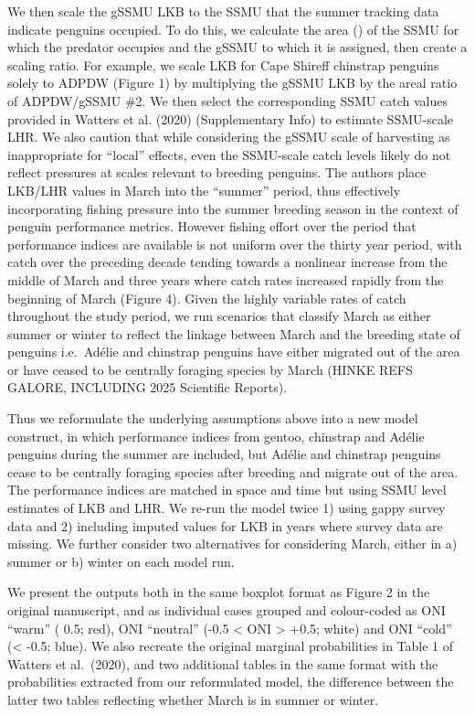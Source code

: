 \documentclass[]{elsarticle} %
\begin{document}
We then scale the gSSMU LKB to the SSMU that the summer tracking data
indicate penguins occupied. To do this, we calculate the area () of the
SSMU for which the predator occupies and the gSSMU to which it is
assigned, then create a scaling ratio. For example, we scale LKB for
Cape Shireff chinstrap penguins solely to ADPDW (Figure 1) by
multiplying the gSSMU LKB by the areal ratio of ADPDW/gSSMU \#2. We then
select the corresponding SSMU catch values provided in Watters et al.
(2020) (Supplementary Info) to estimate SSMU-scale LHR. We also caution
that while considering the gSSMU scale of harvesting as inappropriate
for ``local'' effects, even the SSMU-scale catch levels likely do not
reflect pressures at scales relevant to breeding penguins. The authors
place LKB/LHR values in March into the ``summer'' period, thus
effectively incorporating fishing pressure into the summer breeding
season in the context of penguin performance metrics. However fishing
effort over the period that performance indices are available is not
uniform over the thirty year period, with catch over the preceding
decade tending towards a nonlinear increase from the middle of March and
three years where catch rates increased rapidly from the beginning of
March (Figure 4). Given the highly variable rates of catch throughout
the study period, we run scenarios that classify March as either summer
or winter to reflect the linkage between March and the breeding state of
penguins i.e.~Adélie and chinstrap penguins have either migrated out of
the area or have ceased to be centrally foraging species by March (HINKE
REFS GALORE, INCLUDING 2025 Scientific Reports).

Thus we reformulate the underlying assumptions above into a new model
construct, in which performance indices from gentoo, chinstrap and
Adélie penguins during the summer are included, but Adélie and chinstrap
penguins cease to be centrally foraging species after breeding and
migrate out of the area. The performance indices are matched in space
and time but using SSMU level estimates of LKB and LHR. We re-run the
model twice 1) using gappy survey data and 2) including imputed values
for LKB in years where survey data are missing. We further consider two
alternatives for considering March, either in a) summer or b) winter on
each model run.

We present the outputs both in the same boxplot format as Figure 2 in
the original manuscript, and as individual cases grouped and
colour-coded as ONI ``warm'' ( 0.5; red), ONI ``neutral'' (-0.5
\textless{} ONI \textgreater{} +0.5; white) and ONI ``cold''
(\textless{} -0.5; blue). We also recreate the original marginal
probabilities in Table 1 of Watters et al.~(2020), and two additional
tables in the same format with the probabilities extracted from our
reformulated model, the difference between the latter two tables
reflecting whether March is in summer or winter.
\end{document}

